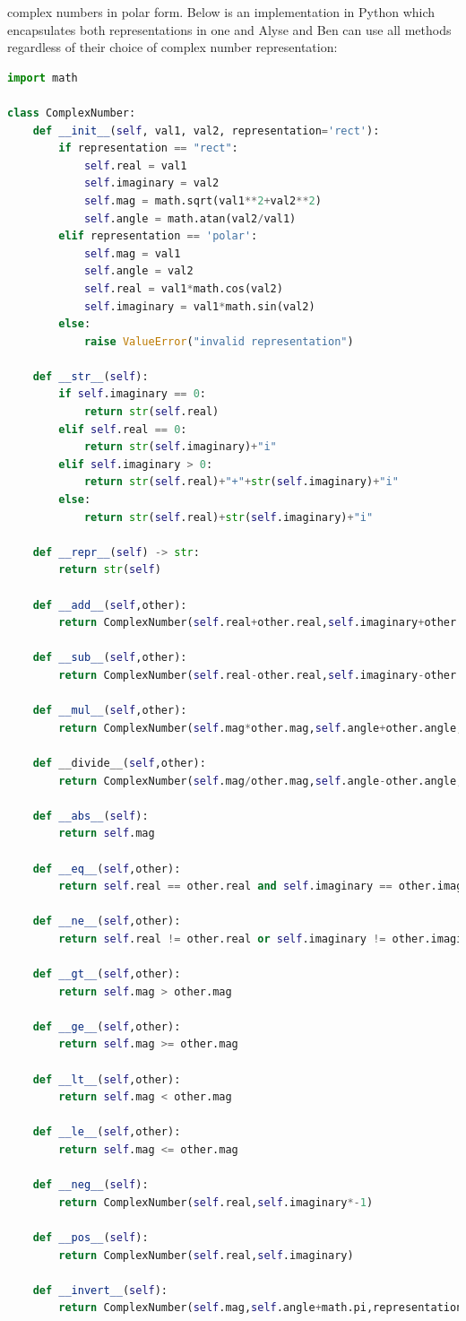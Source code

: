 \documentclass[a4paper,twoside]{article}
\numberwithin{equation}{section}
\begin{document}
complex numbers in polar form. Below is an implementation in Python which encapsulates both representations
in one and Alyse and Ben can use all methods regardless of their choice of complex number representation:
\begin{lstlisting}[language=Python]
import math

class ComplexNumber:
    def __init__(self, val1, val2, representation='rect'):
        if representation == "rect":
            self.real = val1
            self.imaginary = val2
            self.mag = math.sqrt(val1**2+val2**2)
            self.angle = math.atan(val2/val1)
        elif representation == 'polar':
            self.mag = val1
            self.angle = val2
            self.real = val1*math.cos(val2)
            self.imaginary = val1*math.sin(val2)
        else:
            raise ValueError("invalid representation")

    def __str__(self):
        if self.imaginary == 0:
            return str(self.real)
        elif self.real == 0:
            return str(self.imaginary)+"i"
        elif self.imaginary > 0:
            return str(self.real)+"+"+str(self.imaginary)+"i"
        else:
            return str(self.real)+str(self.imaginary)+"i"

    def __repr__(self) -> str:
        return str(self)

    def __add__(self,other):
        return ComplexNumber(self.real+other.real,self.imaginary+other.imaginary)

    def __sub__(self,other):
        return ComplexNumber(self.real-other.real,self.imaginary-other.imaginary)

    def __mul__(self,other):
        return ComplexNumber(self.mag*other.mag,self.angle+other.angle,representation='polar')

    def __divide__(self,other):
        return ComplexNumber(self.mag/other.mag,self.angle-other.angle,representation='polar')

    def __abs__(self):
        return self.mag

    def __eq__(self,other):
        return self.real == other.real and self.imaginary == other.imaginary

    def __ne__(self,other):
        return self.real != other.real or self.imaginary != other.imaginary

    def __gt__(self,other):
        return self.mag > other.mag

    def __ge__(self,other):
        return self.mag >= other.mag

    def __lt__(self,other):
        return self.mag < other.mag

    def __le__(self,other):
        return self.mag <= other.mag

    def __neg__(self):
        return ComplexNumber(self.real,self.imaginary*-1)

    def __pos__(self):
        return ComplexNumber(self.real,self.imaginary)

    def __invert__(self):
        return ComplexNumber(self.mag,self.angle+math.pi,representation='polar')

\end{lstlisting}
\end{document}
